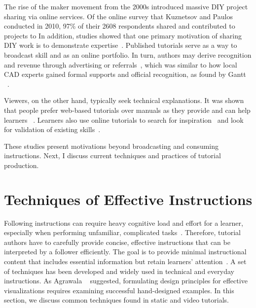 The rise of the maker movement from the 2000s introduced massive DIY project sharing via online services. Of the online survey that Kuznetsov and Paulos~\cite{Kuznetsov:2010:REA:1868914.1868950} conducted in 2010, 97\% of their 2608 respondents shared and contributed to projects to  In addition, studies showed that one primary motivation of sharing DIY work is to demonstrate expertise~\cite{Torrey:2007he,Kuznetsov:2010:REA:1868914.1868950}. Published tutorials serve as a way to broadcast skill and as an online portfolio.
%
In turn, authors may derive recognition and revenue through advertising or referrals~\cite{Lafreniere:2012tl}, which was similar to how local CAD experts gained formal supports and official recognition, as found by Gantt \ea{}~\cite{Gantt:1992:GGP:142750.142767}.

Viewers, on the other hand, typically seek technical explanations. It was shown that people prefer web-based tutorials over manuals as they provide  and can help learners ~\cite{BenLafreniere:2013ux}.
%
Learners also use online tutorials to search for inspiration~\cite{Torrey:2009fc} and look for validation of existing skills~\cite{Lafreniere:2012tl}.

These studies present motivations beyond broadcasting and consuming instructions. Next, I discuss current techniques and practices of tutorial production.



\section{Techniques of Effective Instructions}
\label{background_techniques}

Following instructions can require heavy cognitive load and effort for a learner, especially when performing unfamiliar, complicated tasks~\cite{sweller1998cognitive,sweller1988cognitive}. Therefore, tutorial authors have to carefully provide concise, effective instructions that can be interpreted by a follower efficiently. The goal is to provide minimal instructional content that includes essential information but retain learners' attention~\cite{Black:1986:KMI:29933.275623}.
%
A set of techniques has been developed and widely used in technical and everyday instructions.
%
As Agrawala \ea{}~\cite{Agrawala:2011:DPV:1924421.1924439} suggested, formulating design principles for effective visualizations requires examining successful hand-designed examples. In this section, we discuss common techniques found in static and video tutorials.

